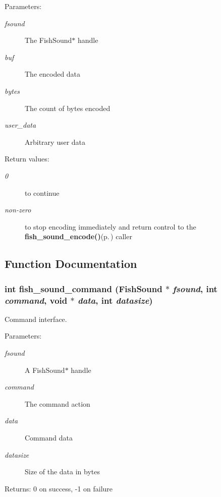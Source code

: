 \begin{Desc}
\item[Parameters:]
\begin{description}
\item[{\em fsound}]The Fish\-Sound$\ast$ handle \item[{\em buf}]The encoded data \item[{\em bytes}]The count of bytes encoded \item[{\em user\_\-data}]Arbitrary user data \end{description}
\end{Desc}
\begin{Desc}
\item[Return values:]
\begin{description}
\item[{\em 0}]to continue \item[{\em non-zero}]to stop encoding immediately and return control to the {\bf fish\_\-sound\_\-encode()}{\rm (p.\,\pageref{fishsound_8h_a8})} caller \end{description}
\end{Desc}


\subsection{Function Documentation}
\subsubsection{\setlength{\rightskip}{0pt plus 5cm}int fish\_\-sound\_\-command ({\bf Fish\-Sound} $\ast$ {\em fsound}, int {\em command}, void $\ast$ {\em data}, int {\em datasize})}\label{fishsound_8h_a12}


Command interface. 

\begin{Desc}
\item[Parameters:]
\begin{description}
\item[{\em fsound}]A Fish\-Sound$\ast$ handle \item[{\em command}]The command action \item[{\em data}]Command data \item[{\em datasize}]Size of the data in bytes \end{description}
\end{Desc}
\begin{Desc}
\item[Returns:]0 on success, -1 on failure \end{Desc}
